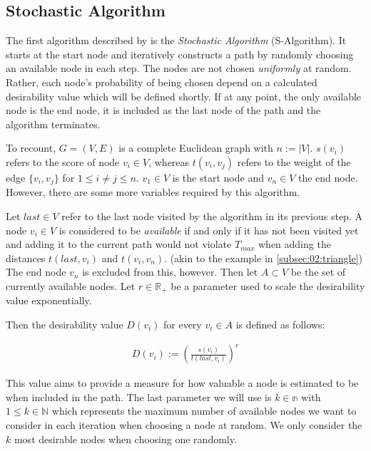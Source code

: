 \subsection{Stochastic Algorithm}
\label{subsec:03:salgo}

The first algorithm described by \citeauthor{tsiligiridis_heuristic_1984} is the \emph{Stochastic Algorithm} (S-Algorithm).
It starts at the start node and iteratively constructs a path by randomly choosing an available node in each step.
The nodes are not chosen \emph{uniformly} at random. Rather, each node's probability of being chosen depend on a calculated desirability value which will be defined shortly.
If at any point, the only available node is the end node, it is included as the last node of the path and the algorithm terminates.

To recount, $G = (V, E)$ is a complete Euclidean graph with $n := |V|$.
$s(v_i)$ refers to the score of node $v_i \in V$, whereas $t(v_i,v_j)$ refers to the weight of the edge $\{v_i, v_j\}$ for $1 \leq i \neq j \leq n$.
$v_1 \in V$ is the start node and $v_n \in V$ the end node.
However, there are some more variables required by this algorithm.

Let $last \in V$ refer to the last node visited by the algorithm in its previous step.
A node $v_i \in V$ is considered to be \emph{available} if and only if it has not been visited yet and adding it to the current path would not violate $T_{max}$ when adding the distances $t(last, v_i)$ and $t(v_i, v_n)$. (akin to the example in \cref{subsec:02:triangle})
The end node $v_n$ is excluded from this, however.
Then let $A \subset V$ be the set of currently available nodes.
Let $r \in \mathbb{R}_+$ be a parameter used to scale the desirability value exponentially.

Then the desirability value $D(v_i)$ for every $v_i \in A$ is defined as follows:

\begin{align*}
	D(v_i) := \left( \frac{s(v_i)}{t(last, v_i)} \right)^r
\end{align*}

This value aims to provide a measure for how valuable a node is estimated to be when included in the path.
The last parameter we will use is $k \in \mathbb{n}$ with $1 \leq k \in \mathbb{N}$ which represents the maximum number of available nodes we want to consider in each iteration when choosing a node at random.
We only consider the $k$ most desirable nodes when choosing one randomly.

